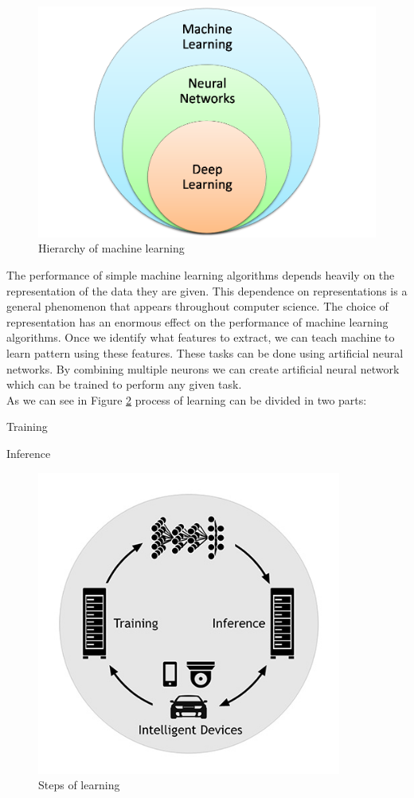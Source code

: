 \begin{figure}[h]
  \centering
  \includegraphics[width=13cm]{img/MLNNDL}
  \caption{Hierarchy of machine learning}\label{MLNNDL}
\end{figure}

 The performance of simple machine learning algorithms depends heavily on the representation of the data they are given. This dependence on representations is a general phenomenon that appears throughout computer science. The choice of representation has an enormous effect on the performance of machine learning algorithms. Once we identify what features to extract, we can teach machine to learn pattern using these features. These tasks can be done using artificial neural networks. By combining multiple neurons we can create artificial neural network which can be trained to perform any given task.\\

As we can see in Figure \ref{learningsteps} process of learning can be divided in two parts:
\begin{tight_enumerate}
  \item Training
  \item Inference
\end{tight_enumerate}

  \begin{figure}[H]
  \centering
  \includegraphics[width=10cm]{img/steps}
  \caption[Steps of learning]{Steps of learning \cite{GTCx}}\label{learningsteps}
\end{figure}

